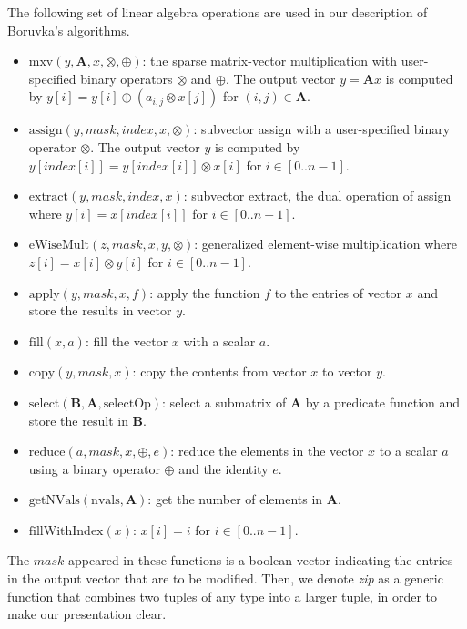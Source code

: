 \documentclass{sokendai_thesis} %
\newcommand{\boruvka}[0]{Boruvka}
\begin{document}
The following set of linear algebra operations are used in our description of \boruvka{}'s algorithms.
\begin{itemize}
\item $\text{mxv}(\mathit{y}, \mathbf{A}, \mathit{x}, \otimes, \oplus)$: the sparse matrix-vector multiplication with user-specified binary operators $\otimes$ and $\oplus$.
The output vector $y=\mathbf{A} x$ is computed by $y[i] = y[i] \oplus (a_{i,j} \otimes x[j])$ for $(i,j)\in \mathbf{A}$.
\item $\text{assign}(\mathit{y}, \mathit{mask}, \mathit{index}, \mathit{x}, \otimes)$: subvector assign with a user-specified binary operator $\otimes$.
The output vector $y$ is computed by $y[index[i]] = y[index[i]] \otimes x[i]$ for $i\in [0..n-1]$.
\item $\text{extract}(\mathit{y}, \mathit{mask}, \mathit{index}, \mathit{x})$: subvector extract, the dual operation of assign where $y[i] = x[index[i]]$ for $i\in [0..n-1]$.
\item $\text{eWiseMult}(\mathit{z}, \mathit{mask}, \mathit{x}, \mathit{y}, \otimes)$: generalized element-wise multiplication where $z[i] = x[i] \otimes y[i]$ for $i\in [0..n-1]$.
\item $\text{apply}(\mathit{y}, \mathit{mask}, \mathit{x}, f)$: apply the function $f$ to the entries of vector $x$ and store the results in vector $y$.
\item $\text{fill}(\mathit{x}, \textit{a})$: fill the vector $x$ with a scalar $a$.
\item $\text{copy}(\mathit{y}, \mathit{mask}, \mathit{x})$: copy the contents from vector $x$ to vector $y$.
\item $\text{select}(\mathbf{B},\mathbf{A},\text{selectOp})$: select a submatrix of $\mathbf{A}$ by a predicate function  and store the result in $\mathbf{B}$.
\item $\text{reduce}(\textit{a}, \mathit{mask}, \mathit{x}, \oplus, \textit{e})$: reduce the elements in the vector $x$ to a scalar $a$ using a binary operator $\oplus$ and the identity $e$.
\item $\text{getNVals} (\text{nvals}, \mathbf{A})$: get the number of elements in $\mathbf{A}$.
\item $\text{fillWithIndex} (\mathit{x})$: $x[i]=i$ for $i\in [0..n-1]$.
\end{itemize}
The $\mathit{mask}$ appeared in these functions is a boolean vector indicating the entries in the output vector that are to be modified.
Then, we denote \emph{zip} as a generic function that combines two tuples of any type into a larger tuple, in order to make our presentation clear.
\end{document}
